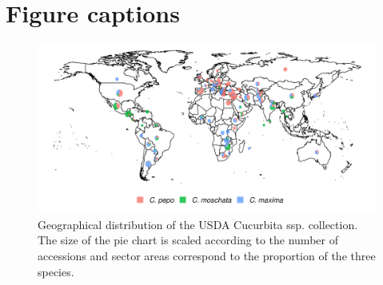 \documentclass[utf8]{FrontiersinHarvard} %
\begin{document}



\section*{Figure captions}


\begin{figure}[h]
\begin{center}
\includegraphics[width=15cm]{../../figures/01_fig.png}%
\end{center}
\caption{Geographical distribution of the USDA Cucurbita ssp. collection. The size of the pie chart is scaled according to the number of accessions and sector areas correspond to the proportion of the three species. \label{fig:1}}
\end{figure}
\end{document}
